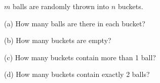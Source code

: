   $m$ balls are randomly thrown into $n$ buckets.
  \begin{myenum}

  \item[(a)] 
    How many balls are there in each bucket?

  \item[(b)]
    How many buckets are empty?
  
  \item[(c)]
    How many buckets contain more than 1 ball?

  \item[(d)]
    How many buckets contain exactly 2 balls?
  \end{myenum}
